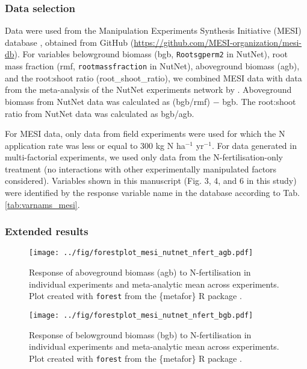 \documentclass{myreport}
\begin{document}
\subsubsection{Data selection}

Data were used from the Manipulation Experiments Synthesis Initiative (MESI) database \citep{vansundert_when_2023}, obtained from GitHub (\url{https://github.com/MESI-organization/mesi-db}). For variables belowground biomass (bgb, \texttt{Rootsgperm2} in NutNet), root mass fraction (rmf, \texttt{rootmassfraction} in NutNet), aboveground biomass (agb), and the root:shoot ratio (root\_shoot\_ratio), we combined MESI data with data from the meta-analysis of the NutNet experiments network by \citet{cleland_belowground_2019}. Aboveground biomass from NutNet data was calculated as (bgb/rmf) $-$ bgb. The root:shoot ratio from NutNet data was calculated as bgb/agb. 

For MESI data, only data from field experiments were used for which the N application rate was less or equal to 300 kg N ha$^{-1}$ yr$^{-1}$. For data generated in multi-factorial experiments, we used only data from the N-fertilisation-only treatment (no interactions with other experimentally manipulated factors considered). Variables shown in this manuscript (Fig. 3, 4, and 6 in this study) were identified by the response variable name in the database according to Tab. \ref{tab:varnams_mesi}.

\subsubsection{Extended results}

\begin{figure}[h]
\centering
\texttt{[image: ../fig/forestplot\_mesi\_nutnet\_nfert\_agb.pdf]}
\caption{Response of aboveground biomass (agb) to N-fertilisation in individual experiments and meta-analytic mean across experiments. Plot created with \texttt{forest} from the \{metafor\} R package \cite{viechtbauer_conducting_2010}.}
\end{figure}

\begin{figure}[h]
\centering
\texttt{[image: ../fig/forestplot\_mesi\_nutnet\_nfert\_bgb.pdf]}
\caption{Response of belowground biomass (bgb) to N-fertilisation in individual experiments and meta-analytic mean across experiments. Plot created with \texttt{forest} from the \{metafor\} R package \cite{viechtbauer_conducting_2010}.}
\end{figure}
\end{document}
